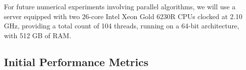 For future numerical experiments involving parallel algorithms, 
we will use a server equipped with two 26-core Intel Xeon Gold 6230R CPUs clocked at 2.10 GHz,
providing a total count of 104 threads, running on a 64-bit architecture, with 512 GB of RAM.



\subsection{Initial Performance Metrics}
\label{sec:WP1:CGAL:metrics}



%

